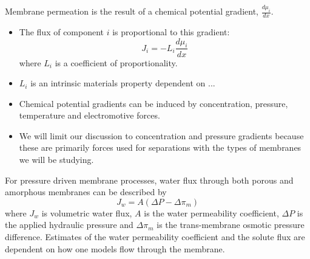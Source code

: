   \noindent Membrane permeation is the result of a chemical potential gradient, $\frac{d\mu_i}{dx}$.
  \begin{itemize}
	  \item The flux of component $i$ is proportional to this gradient:
	  \begin{equation}
	    J_i = -L_i \frac{d\mu_i}{dx}
	  \end{equation}
	  where $L_i$ is a coefficient of proportionality.~\cite{wijmans_solution-diffusion_1995}
	  \item $L_i$ is an intrinsic materials property dependent on ... %
	  \item Chemical potential gradients can be induced by concentration, pressure, 
	  temperature and electromotive forces.
	  \item We will limit our discussion to concentration and pressure gradients because 
	  these are primarily forces used for separations with the types of membranes we 
	  will be studying.
  \end{itemize}

  For pressure driven membrane processes, water flux through both porous and 
  amorphous membranes can be described by
  \begin{equation}
  J_w = A(\Delta P - \Delta \pi_m)
  \end{equation}
  where $J_w$ is volumetric water flux, $A$ is the water permeability coefficient,
  $\Delta P$ is the applied hydraulic pressure and $\Delta \pi_m$ is the 
  trans-membrane osmotic pressure difference. Estimates of the water permeability 
  coefficient and the solute flux are dependent on how one models flow through the 
  membrane.

